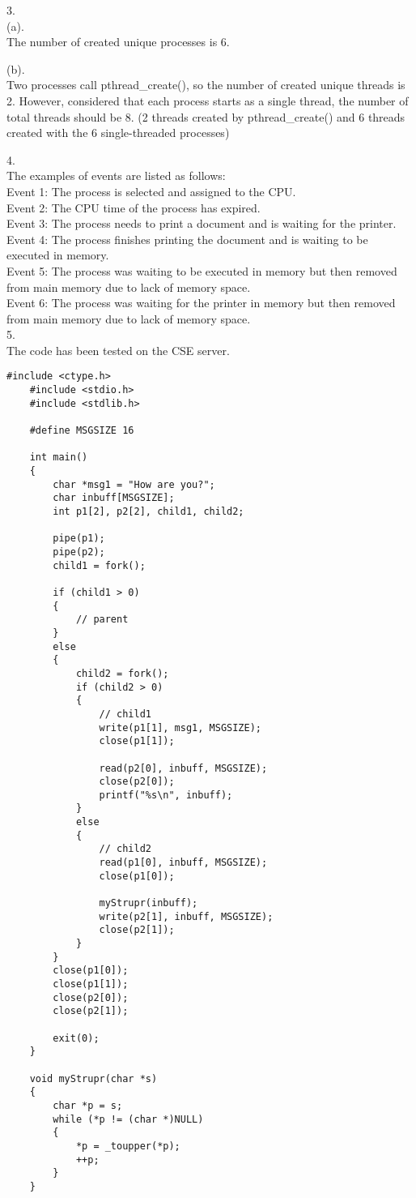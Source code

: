 \documentclass[a4paper]{article}
\begin{document}
3.\\
(a).\\
The number of created unique processes is 6.

(b).\\
Two processes call pthread\_create(), so the number of created unique threads is 2.
However, considered that each process starts as a single thread, the number of total threads should be 8. (2 threads created by pthread\_create() and 6 threads created with the 6 single-threaded processes)

4.\\
The examples of events are listed as follows:\\
Event 1: The process is selected and assigned to the CPU. \\
Event 2: The CPU time of the process has expired.\\
Event 3: The process needs to print a document and is waiting for the printer.\\
Event 4: The process finishes printing the document and is waiting to be executed in memory.\\
Event 5: The process was waiting to be executed in memory but then removed from main memory due to lack of memory space.\\
Event 6: The process was waiting for the printer in memory but then removed from main memory due to lack of memory space.\\

5.\\
The code has been tested on the CSE server.

\begin{lstlisting}[style=CStyle]
    #include <ctype.h>
    #include <stdio.h>
    #include <stdlib.h>
    
    #define MSGSIZE 16
    
    int main()
    {
        char *msg1 = "How are you?";
        char inbuff[MSGSIZE];
        int p1[2], p2[2], child1, child2;
    
        pipe(p1);
        pipe(p2);
        child1 = fork();
    
        if (child1 > 0)
        {
            // parent
        }
        else
        {
            child2 = fork();
            if (child2 > 0)
            {
                // child1
                write(p1[1], msg1, MSGSIZE);
                close(p1[1]);
    
                read(p2[0], inbuff, MSGSIZE);
                close(p2[0]);
                printf("%s\n", inbuff);
            }
            else
            {
                // child2
                read(p1[0], inbuff, MSGSIZE);
                close(p1[0]);
    
                myStrupr(inbuff);
                write(p2[1], inbuff, MSGSIZE);
                close(p2[1]);
            }
        }
        close(p1[0]);
        close(p1[1]);
        close(p2[0]);
        close(p2[1]);
    
        exit(0);
    }
    
    void myStrupr(char *s)
    {
        char *p = s;
        while (*p != (char *)NULL)
        {
            *p = _toupper(*p);
            ++p;
        }
    }
\end{lstlisting}
\end{document}
